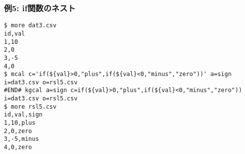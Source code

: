 \subsubsection*{例5: if関数のネスト}



\begin{Verbatim}[baselinestretch=0.7,frame=single]
$ more dat3.csv
id,val
1,10
2,0
3,-5
4,0
$ mcal c='if(${val}>0,"plus",if(${val}<0,"minus","zero"))' a=sign i=dat3.csv o=rsl5.csv
#END# kgcal a=sign c=if(${val}>0,"plus",if(${val}<0,"minus","zero")) i=dat3.csv o=rsl5.csv
$ more rsl5.csv
id,val,sign
1,10,plus
2,0,zero
3,-5,minus
4,0,zero
\end{Verbatim}
